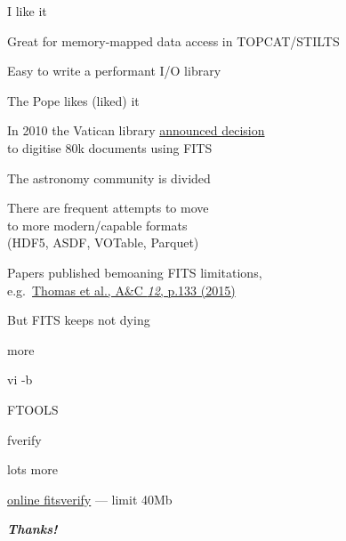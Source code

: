 \documentclass[20pt,landscape]{foils}
\newif\ifrubric
\newcommand{\bhref}[2]{\href{#1}{{\color{blue}#2}}}
\begin{document}
\begin{list1}
  \item I like it
  \begin{list2big}
    \item Great for memory-mapped data access in TOPCAT/STILTS
    \item Easy to write a performant I/O library
  \end{list2big}
  \item The Pope likes (liked) it
  \begin{list2big}
    \item In 2010 the Vatican library 
          \bhref{https://www.vaticanlibrary.va/en/the-collections/in-digitalizzation.html}
                {announced decision} \\
          to digitise 80k documents using FITS
  \end{list2big}
  \item The astronomy community is divided
  \begin{list2big}
    \item There are frequent attempts to move \\
          to more modern/capable formats \\
          (HDF5, ASDF, VOTable, Parquet)
    \item Papers published bemoaning FITS limitations,
          \\ e.g.\
          \bhref{https://ui.adsabs.harvard.edu/abs/2015A&C....12..133T}
                {Thomas et al., A\&C {\sl 12}, p.133 (2015)}
    \item But FITS keeps not dying
  \end{list2big}
\end{list1}


\begin{list2}
  \item more
  \item vi -b
  \item FTOOLS
  \begin{list3}
    \item fverify 
    \item lots more
  \end{list3}
  \item \bhref{https://fits.gsfc.nasa.gov/fits_verify.html}{online fitsverify}
        --- limit 40Mb
\end{list2}


\vspace{0.2cm}
\begin{center}
  {\color{darkred}\Huge\bf\sl Thanks!}
\end{center}

\label{lastPage}

\ifrubric

\newcommand{\aobSlide}[1]{
\newpage
\rightfooter{}
\MyLogo{}
\begin{picture}(30,0)
  #1
\end{picture}
\bigword{AOB?}
}
\aobSlide{}

\fi
\end{document}
